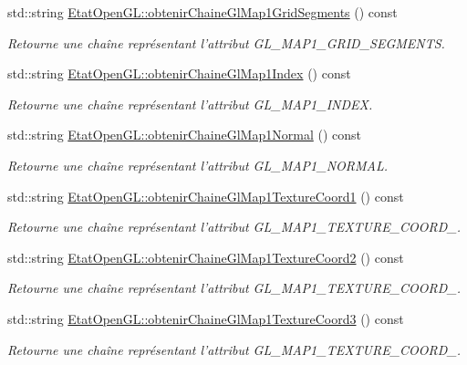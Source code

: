 \begin{DoxyCompactItemize}
std\-::string \hyperlink{group__utilitaire_gaef4171a2ed92756d394ed8bae1fc57cd}{Etat\-Open\-G\-L\-::obtenir\-Chaine\-Gl\-Map1\-Grid\-Segments} () const 
\begin{DoxyCompactList}\small\item\em Retourne une chaîne représentant l'attribut G\-L\-\_\-\-M\-A\-P1\-\_\-\-G\-R\-I\-D\-\_\-\-S\-E\-G\-M\-E\-N\-T\-S. \end{DoxyCompactList}\item 
std\-::string \hyperlink{group__utilitaire_ga52ba9a6fe299e4342d28baac6a83c769}{Etat\-Open\-G\-L\-::obtenir\-Chaine\-Gl\-Map1\-Index} () const 
\begin{DoxyCompactList}\small\item\em Retourne une chaîne représentant l'attribut G\-L\-\_\-\-M\-A\-P1\-\_\-\-I\-N\-D\-E\-X. \end{DoxyCompactList}\item 
std\-::string \hyperlink{group__utilitaire_gad0e75e07ddc5d51e11b4a9b525ee4190}{Etat\-Open\-G\-L\-::obtenir\-Chaine\-Gl\-Map1\-Normal} () const 
\begin{DoxyCompactList}\small\item\em Retourne une chaîne représentant l'attribut G\-L\-\_\-\-M\-A\-P1\-\_\-\-N\-O\-R\-M\-A\-L. \end{DoxyCompactList}\item 
std\-::string \hyperlink{group__utilitaire_gaf06cacbe0ee8f4fe4a6f56571fb8c27c}{Etat\-Open\-G\-L\-::obtenir\-Chaine\-Gl\-Map1\-Texture\-Coord1} () const 
\begin{DoxyCompactList}\small\item\em Retourne une chaîne représentant l'attribut G\-L\-\_\-\-M\-A\-P1\-\_\-\-T\-E\-X\-T\-U\-R\-E\-\_\-\-C\-O\-O\-R\-D\-\_. \end{DoxyCompactList}\item 
std\-::string \hyperlink{group__utilitaire_gade175aafd1123e597959f78fbe04489f}{Etat\-Open\-G\-L\-::obtenir\-Chaine\-Gl\-Map1\-Texture\-Coord2} () const 
\begin{DoxyCompactList}\small\item\em Retourne une chaîne représentant l'attribut G\-L\-\_\-\-M\-A\-P1\-\_\-\-T\-E\-X\-T\-U\-R\-E\-\_\-\-C\-O\-O\-R\-D\-\_. \end{DoxyCompactList}\item 
std\-::string \hyperlink{group__utilitaire_ga6690ab58fbdae84d2543e29cc9e4c41d}{Etat\-Open\-G\-L\-::obtenir\-Chaine\-Gl\-Map1\-Texture\-Coord3} () const 
\begin{DoxyCompactList}\small\item\em Retourne une chaîne représentant l'attribut G\-L\-\_\-\-M\-A\-P1\-\_\-\-T\-E\-X\-T\-U\-R\-E\-\_\-\-C\-O\-O\-R\-D\-\_. \end{DoxyCompactList}\item 

\end{DoxyCompactItemize}
